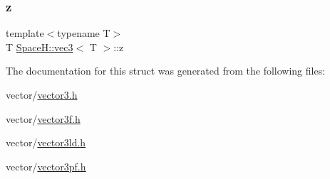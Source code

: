 \subsubsection{\texorpdfstring{z}{z}}
{\footnotesize\ttfamily template$<$typename T$>$ \\
T \mbox{\hyperlink{struct_space_h_1_1vec3}{Space\+H\+::vec3}}$<$ T $>$\+::z}



The documentation for this struct was generated from the following files\+:\begin{DoxyCompactItemize}
\item 
vector/\mbox{\hyperlink{vector3_8h}{vector3.\+h}}\item 
vector/\mbox{\hyperlink{vector3f_8h}{vector3f.\+h}}\item 
vector/\mbox{\hyperlink{vector3ld_8h}{vector3ld.\+h}}\item 
vector/\mbox{\hyperlink{vector3pf_8h}{vector3pf.\+h}}\end{DoxyCompactItemize}
